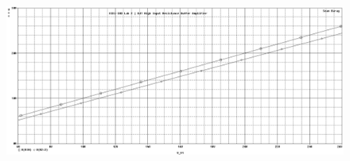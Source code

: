 \begin{figure}[H]
	\centering
	\includegraphics[width=\pwidth]{img/plot/bjtPlotV.PNG}
	\parbox{\pwidth}{
	\caption{}
	\label{fig:bjtPlotV}}
\end{figure}
